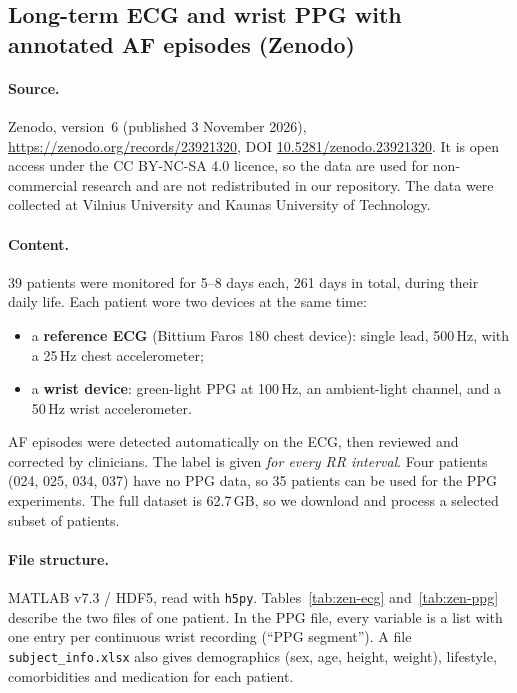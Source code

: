 \documentclass[11pt]{article}
\newcommand{\var}[1]{\texttt{#1}}
\begin{document}
\subsection{Long-term ECG and wrist PPG with annotated AF episodes (Zenodo)}

\paragraph{Source.} Zenodo, version~6 (published 3 November 2026),
\url{https://zenodo.org/records/23921320}, DOI
\href{https://doi.org/10.5281/zenodo.23921320}{10.5281/zenodo.23921320}. It
is open access under the CC BY-NC-SA 4.0 licence, so the data are used for
non-commercial research and are not redistributed in our repository. The
data were collected at Vilnius University and Kaunas University of
Technology.

\paragraph{Content.} 39 patients were monitored for 5--8 days each, 261 days
in total, during their daily life. Each patient wore two devices at the same
time:
\begin{itemize}
  \item a \textbf{reference ECG} (Bittium Faros 180 chest device): single
  lead, 500\,Hz, with a 25\,Hz chest accelerometer;
  \item a \textbf{wrist device}: green-light PPG at 100\,Hz, an ambient-light
  channel, and a 50\,Hz wrist accelerometer.
\end{itemize}
AF episodes were detected automatically on the ECG, then reviewed and
corrected by clinicians. The label is given \emph{for every RR interval}.
Four patients (024, 025, 034, 037) have no PPG data, so 35 patients can be
used for the PPG experiments. The full dataset is 62.7\,GB, so we download
and process a selected subset of patients.

\paragraph{File structure.} MATLAB v7.3 / HDF5, read with \var{h5py}.
Tables~\ref{tab:zen-ecg} and~\ref{tab:zen-ppg} describe the two files of one
patient. In the PPG file, every variable is a list with one entry per
continuous wrist recording (``PPG segment''). A file
\var{subject\_info.xlsx} also gives demographics (sex, age, height, weight),
lifestyle, comorbidities and medication for each patient.
\end{document}
